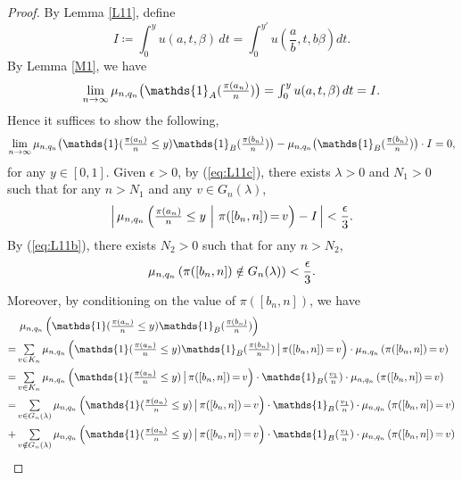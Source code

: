 \begin{proof}
By Lemma \ref{L11}, define
\[
I \coloneqq \int_{0}^{y} u(a, t, \beta)\,dt = \int_{0}^{y'} u\left(\frac{a}{b}, t, b \beta\right)dt.
\]
By Lemma \ref{M1}, we have
\[
\textstyle\lim\limits_{n \to \infty} \n \big(\mathds{1}_A(\frac{\pi(a_n)}{n})\big) = \int_{0}^{y} u(a, t, \beta)\,dt = I.
\]
Hence it suffices to show the following,
\begin{equation}
\textstyle\lim\limits_{n \to \infty}\n\big( \mathds{1}(\frac{\pi(a_n)}{n} \le y)\mathds{1}_B(\frac{\pi(b_n)}{n})\big) -
 \n\big(\mathds{1}_B(\frac{\pi(b_n)}{n})\big)\cdot I = 0,   \label{eq:L12a}
\end{equation}
for any $y \in [0, 1]$.
Given $\epsilon > 0$, by (\ref{eq:L11c}), there exists $\lambda > 0$ and $N_1 > 0$ such that for any $n > N_1$ and any $v \in G_n(\lambda)$,
\begin{equation}
\textstyle\left|\, \mu_{n, q_n} \left( \frac{\pi(a_n)}{n} \le y \ \middle|\  \pi([b_n, n]) \,{=}\, v \right) -
I \,\right| < \displaystyle\frac{\epsilon}{3} . \label{eq:L12b}
\end{equation}
By (\ref{eq:L11b}), there exists $N_2>0$ such that for any $n > N_2$,
\begin{equation}
\mu_{n, q_n} \left( \pi([b_n, n]) \notin G_n(\lambda) \right) < \frac{\epsilon}{3}. \label{eq:L12c}
\end{equation}
Moreover, by conditioning on the value of $\pi([b_n, n])$, we have
\begin{align*}
   &\ \textstyle\n\left( \mathds{1}(\frac{\pi(a_n)}{n} \le y)\mathds{1}_B(\frac{\pi(b_n)}{n})\right)\\
 {=} &\textstyle\sum\limits_{v \in K_n}\textstyle \n\left( \mathds{1}(\frac{\pi(a_n)}{n} \le y)\mathds{1}_B(\frac{\pi(b_n)}{n}) \, \big|\,  \pi([b_n, n]) \,{=}\, v \right) \cdot
     \n \left( \pi([b_n, n]) \,{=}\, v \right)\\
 {=} &\textstyle\sum\limits_{v \in K_n} \textstyle\n\left( \mathds{1}(\frac{\pi(a_n)}{n} \le y) \,\big|\, \pi([b_n, n]) \,{=}\, v \right)\cdot
      \mathds{1}_B(\frac{v_1}{n}) \cdot \n \left( \pi([b_n, n]) \,{=}\, v \right)\\
 {=} &\textstyle\sum\limits_{v \in G_n(\lambda)} \textstyle\n\left( \mathds{1}(\frac{\pi(a_n)}{n} \le y) \, \big|\, \pi([b_n, n]) \,{=}\, v \right)\cdot
      \mathds{1}_B(\frac{v_1}{n}) \cdot \n \left( \pi([b_n, n]) \,{=}\, v \right)\\
  + &\textstyle\sum\limits_{v \notin G_n(\lambda)} \textstyle\n\left( \mathds{1}(\frac{\pi(a_n)}{n} \le y) \,\big|\, \pi([b_n, n]) \,{=}\, v \right)\cdot
      \mathds{1}_B(\frac{v_1}{n}) \cdot \n \left( \pi([b_n, n]) \,{=}\, v \right)\\

\end{align*}
\end{proof}
